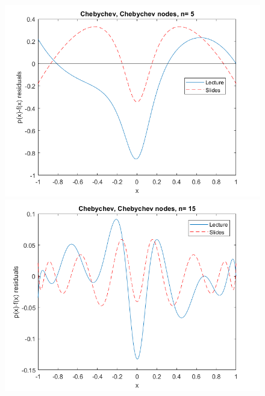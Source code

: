 \documentclass{article}
\begin{document}
	\begin{figure}[h]
	\begin{minipage}{0.56\textwidth}
	  \includegraphics[width = \textwidth, keepaspectratio]{n5lecsli.png}
    \end{minipage}
    \begin{minipage}{0.56\textwidth}
	  \includegraphics[width = \textwidth, keepaspectratio]{n15lecsli.png}
    \end{minipage}
    \begin{minipage}{0.56\textwidth}

\end{minipage}
\end{figure}
\end{document}
